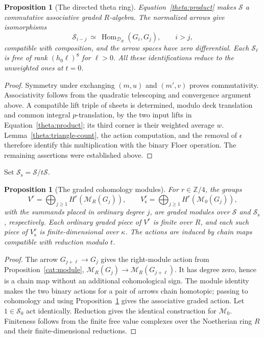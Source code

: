 \documentclass[11pt]{article}
\newtheorem{proposition}[theorem]{Proposition}
\theoremstyle{definition}
\theoremstyle{remark}
\newcommand{\Z}{\mathbb Z}
\DeclareMathOperator{\Hom}{Hom}
\numberwithin{equation}{section}
\begin{document}
\begin{proposition}[The directed theta ring]\label{theta:directed-ring}
Equation~\eqref{theta:product} makes $\mathscr S$ a commutative associative
graded $R$-algebra.  The normalized arrows give isomorphisms
\[
 \mathscr S_{i-j}\ \simeq\
       \Hom_{\mathcal D_R}(G_i,G_j),\qquad i>j,
\]
compatible with composition, and the arrow spaces have zero differential.
Each $\mathscr S_\ell$ is free of rank $(h_0\ell)^8$ for $\ell>0$.
All these identifications reduce to the unweighted ones at $t=0$.
\end{proposition}

\begin{proof}
Symmetry under exchanging $(m,u)$ and $(m',v)$ proves commutativity.
Associativity follows from the quadratic telescoping and convergence
argument above.  A compatible lift triple of sheets is determined, modulo
deck translation and common integral $p$-translation, by the two input
lifts in Equation~\eqref{theta:product}; its third corner is their weighted
average $w$.  Lemma~\ref{theta:triangle-count}, the action computation, and
the removal of $\epsilon$ therefore identify this multiplication with the
binary Floer operation.  The remaining assertions were established above.
\end{proof}

Set $\mathscr S_{\mathrm s}=\mathscr S/t\mathscr S$.
\begin{proposition}[The graded cohomology modules]\label{theta:modules}
For $r\in\Z/4$, the groups
\begin{equation}\label{theta:module-definition}
 V^r=\bigoplus_{j\geq1}H^r(\mathcal M_R(G_j)),\qquad
 V_{\mathrm s}^r=\bigoplus_{j\geq1}H^r(\mathcal M_0(G_j)),
\end{equation}
with the summands placed in ordinary degree $j$, are graded modules over
$\mathscr S$ and $\mathscr S_{\mathrm s}$, respectively.  Each ordinary
graded piece of $V^r$ is finite over $R$, and each such piece of
$V_{\mathrm s}^r$ is finite-dimensional over $\kappa$.  The actions are
induced by chain maps compatible with reduction modulo $t$.
\end{proposition}

\begin{proof}
The arrow $G_{j+\ell}\to G_j$ gives the right-module action from
Proposition~\ref{cat:module},
$\mathcal M_R(G_j)\to\mathcal M_R(G_{j+\ell})$.  It has degree zero, hence
is a chain map without an additional cohomological sign.  The module
identity makes the two binary actions for a pair of arrows chain
homotopic; passing to cohomology and using
Proposition~\ref{theta:directed-ring} gives the associative graded action.
Let $1\in\mathscr S_0$ act identically.  Reduction gives the identical
construction for $\mathcal M_0$.  Finiteness follows from the finite free
value complexes over the Noetherian ring $R$ and their finite-dimensional
reductions.
\end{proof}
\end{document}
